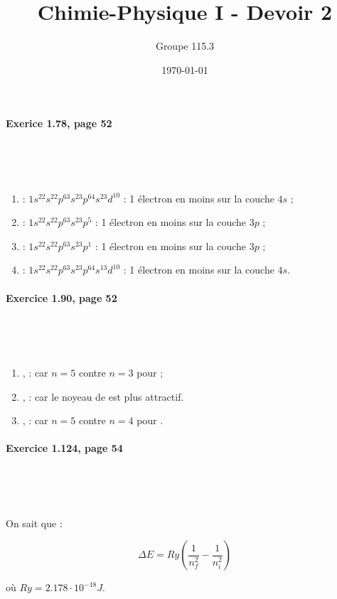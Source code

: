 \documentclass{article}
\title{Chimie-Physique I - Devoir 2}
\author{Groupe 115.3}
\date{\today}
\newcommand\exercice[1]{%
\paragraph{#1}%
~\par
~\par}
\begin{document}
\maketitle

\exercice{Exerice 1.78, page 52}

\begin{enumerate}
  \item {} : $1s^22s^22p^63s^23p^64s^23d^{10}$ : 1 électron en moins sur la couche $4s$ ;
  \item {} : $1s^22s^22p^63s^23p^5$ : 1 électron en moins sur la couche $3p$ ;
  \item {} : $1s^22s^22p^63s^23p^1$ : 1 électron en moins sur la couche $3p$ ;
  \item {} : $1s^22s^22p^63s^23p^64s^13d^{10}$ : 1 électron en moins sur la couche $4s$.
\end{enumerate}

\exercice{Exercice 1.90, page 52}

\begin{enumerate}
	\item {},  :  car $n = 5$ contre $n = 3$ pour  ;
	\item {},  :  car le noyeau de  est plus attractif.
	\item {},  :  car $n = 5$ contre $n = 4$ pour .
\end{enumerate}

\exercice{Exercice 1.124, page 54}

On sait que :

$$\Delta E = Ry(\frac{1}{n^2_f} - \frac{1}{n^2_i})$$

où $Ry = 2.178 \cdot 10^{-18} J$.
\end{document}
